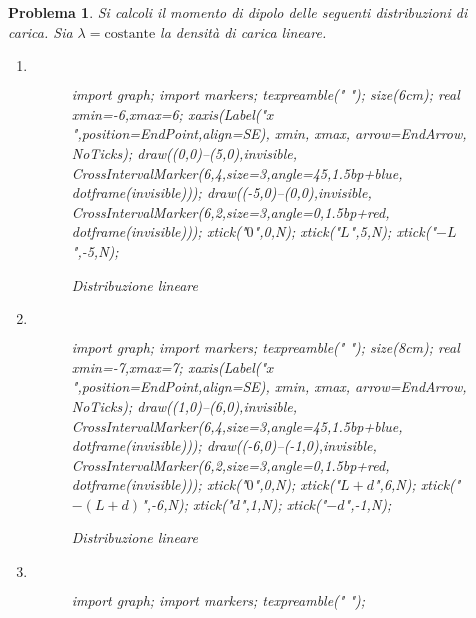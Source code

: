 \documentclass[b5paper,twoside]{book}
\newtheorem{problema}{Problema}
\let\oldhat\hat
\renewcommand{\vec}[1]{\mathbf{#1}}
\renewcommand{\hat}[1]{\widehat{\mathbf{#1}}}
\begin{document}
\begin{problema}
	Si calcoli il momento di dipolo delle seguenti distribuzioni di carica. 
	Sia $\lambda = \mathrm{costante}$ la densità di carica lineare.
	\begin{enumerate}
		\item $\,$
		\begin{figure}[H]
			\centering
			\begin{asy}
				import graph;
				import markers;
				texpreamble("\let\oldhat\hat
				\renewcommand{\vec}[1]{\mathbf{#1}}
				\renewcommand{\hat}[1]{\oldhat{\mathbf{#1}}}");
				size(6cm);
				real xmin=-6,xmax=6;
				xaxis(Label("\small $x$",position=EndPoint,align=SE),
				xmin, xmax, arrow=EndArrow, NoTicks);
				draw((0,0)--(5,0),invisible,
				CrossIntervalMarker(6,4,size=3,angle=45,1.5bp+blue,
				dotframe(invisible)));
				draw((-5,0)--(0,0),invisible,
				CrossIntervalMarker(6,2,size=3,angle=0,1.5bp+red,
				dotframe(invisible)));
				xtick("\small $0$",0,N);
				xtick("\small $L$",5,N);
				xtick("\small $-L$",-5,N);
			\end{asy}
			\caption{Distribuzione lineare}
			\label{fig:distribuzione_01}
		\end{figure}
		\item $\,$
		\begin{figure}[H]
			\centering
			\begin{asy}
				import graph;
				import markers;
				texpreamble("\let\oldhat\hat
				\renewcommand{\vec}[1]{\mathbf{#1}}
				\renewcommand{\hat}[1]{\oldhat{\mathbf{#1}}}");
				size(8cm);
				real xmin=-7,xmax=7;
				xaxis(Label("\small $x$",position=EndPoint,align=SE),
				xmin, xmax, arrow=EndArrow, NoTicks);
				draw((1,0)--(6,0),invisible,
				CrossIntervalMarker(6,4,size=3,angle=45,1.5bp+blue,
				dotframe(invisible)));
				draw((-6,0)--(-1,0),invisible,
				CrossIntervalMarker(6,2,size=3,angle=0,1.5bp+red,
				dotframe(invisible)));
				xtick("\small $0$",0,N);
				xtick("\small $L+d$",6,N);
				xtick("\small $-(L+d)$",-6,N);
				xtick("\small $d$",1,N);
				xtick("\small $-d$",-1,N);
			\end{asy}
			\caption{Distribuzione lineare}
			\label{fig:distribuzione_02}
		\end{figure}
		\item $\,$
		\begin{figure}[H]
			\centering
			\begin{asy}
				import graph;
				import markers;
				texpreamble("\let\oldhat\hat
				\renewcommand{\vec}[1]{\mathbf{#1}}
				\renewcommand{\hat}[1]{\oldhat{\mathbf{#1}}}");

\end{asy}
\end{figure}
\end{enumerate}
\end{problema}
\end{document}
